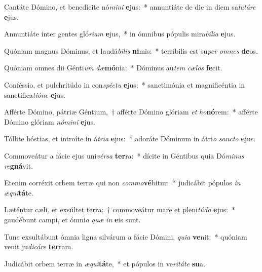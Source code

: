 \item Cantáte Dómino, et benedícite nó\textit{mi}\textit{ni} \textbf{e}jus:~* annuntiáte de die in diem sa\textit{lu}\textit{tá}\textit{re} \textbf{e}jus.
\item Annuntiáte inter gentes gló\textit{ri}\textit{am} \textbf{e}jus,~* in ómnibus pópulis mira\textit{bí}\textit{li}\textit{a} \textbf{e}jus.
\item Quóniam magnus Dóminus, et laudá\textit{bi}\textit{lis} \textbf{ni}mis:~* terríbilis est su\textit{per} \textit{om}\textit{nes} \textbf{de}os.
\item Quóniam omnes dii Génti\textit{um} \textit{dæ}\textbf{mó}nia:~* Dóminus au\textit{tem} \textit{cæ}\textit{los} \textbf{fe}cit.
\item Conféssio, et pulchritúdo in con\textit{spéc}\textit{tu} \textbf{e}jus:~* sanctimónia et magnificéntia in sanctifica\textit{ti}\textit{ó}\textit{ne} \textbf{e}jus.
\item Afférte Dómino, pátriæ Géntium,~† afférte Dómino glóriam \textit{et} \textit{ho}\textbf{nó}rem:~* afférte Dómino glóriam \textit{nó}\textit{mi}\textit{ni} \textbf{e}jus.
\item Tóllite hóstias, et introíte in á\textit{tri}\textit{a} \textbf{e}jus:~* adoráte Dóminum in átri\textit{o} \textit{sanc}\textit{to} \textbf{e}jus.
\item Commoveátur a fácie ejus uni\textit{vér}\textit{sa} \textbf{ter}ra:~* dícite in Géntibus quia Dó\textit{mi}\textit{nus} \textit{re}\textbf{gná}vit.
\item Etenim corréxit orbem terræ qui non \textit{com}\textit{mo}\textbf{vé}bitur:~* judicábit pópulos \textit{in} \textit{æ}\textit{qui}\textbf{tá}te.
\item Læténtur cæli, et exsúltet terra:~† commoveátur mare et pleni\textit{tú}\textit{do} \textbf{e}jus:~* gaudébunt campi, et ómni\textit{a} \textit{quæ} \textit{in} \textbf{e}is sunt.
\item Tunc exsultábunt ómnia ligna silvárum a fácie Dómini, \textit{qui}\textit{a} \textbf{ve}nit:~* quóniam venit ju\textit{di}\textit{cá}\textit{re} \textbf{ter}ram.
\item Judicábit orbem terræ in \textit{æ}\textit{qui}\textbf{tá}te,~* et pópulos in ve\textit{ri}\textit{tá}\textit{te} \textbf{su}a.
